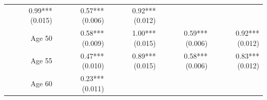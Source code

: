 \documentclass[]{article}
\begin{document}
\begin{longtable}[c]{@{}rrrrr@{}}
\begin{minipage}[t]{0.16\columnwidth}
0.99*** (0.015)
\strut\end{minipage} &
\begin{minipage}[t]{0.18\columnwidth}\raggedleft\strut
0.57*** (0.006)
\strut\end{minipage} &
\begin{minipage}[t]{0.15\columnwidth}\raggedleft\strut
0.92*** (0.012)
\strut\end{minipage}\tabularnewline
\begin{minipage}[t]{0.17\columnwidth}\raggedleft\strut
Age 50
\strut\end{minipage} &
\begin{minipage}[t]{0.20\columnwidth}\raggedleft\strut
0.58*** (0.009)
\strut\end{minipage} &
\begin{minipage}[t]{0.16\columnwidth}\raggedleft\strut
1.00*** (0.015)
\strut\end{minipage} &
\begin{minipage}[t]{0.18\columnwidth}\raggedleft\strut
0.59*** (0.006)
\strut\end{minipage} &
\begin{minipage}[t]{0.15\columnwidth}\raggedleft\strut
0.92*** (0.012)
\strut\end{minipage}\tabularnewline
\begin{minipage}[t]{0.17\columnwidth}\raggedleft\strut
Age 55
\strut\end{minipage} &
\begin{minipage}[t]{0.20\columnwidth}\raggedleft\strut
0.47*** (0.010)
\strut\end{minipage} &
\begin{minipage}[t]{0.16\columnwidth}\raggedleft\strut
0.89*** (0.015)
\strut\end{minipage} &
\begin{minipage}[t]{0.18\columnwidth}\raggedleft\strut
0.58*** (0.006)
\strut\end{minipage} &
\begin{minipage}[t]{0.15\columnwidth}\raggedleft\strut
0.83*** (0.012)
\strut\end{minipage}\tabularnewline
\begin{minipage}[t]{0.17\columnwidth}\raggedleft\strut
Age 60
\strut\end{minipage} &
\begin{minipage}[t]{0.20\columnwidth}\raggedleft\strut
0.23*** (0.011)
\strut\end{minipage} &
\begin{minipage}[t]{0.16\columnwidth}\raggedleft\strut

\end{minipage}
\end{longtable}
\end{document}
